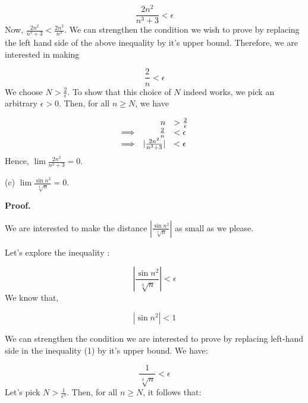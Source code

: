 \documentclass[10pt]{article}
\begin{document}
\begin{equation*}
\frac{2n^{2}}{n^{3} +3} < \epsilon 
\end{equation*}
Now, $\displaystyle \frac{2n^{2}}{n^{3} +3} < \frac{2n^{2}}{n^{3}}$. We can strengthen the condition we wish to prove by replacing the left hand side of the above inequality by it's upper bound. Therefore, we are interested in making


\begin{equation*}
\frac{2}{n} < \epsilon 
\end{equation*}
We choose $\displaystyle N >\frac{2}{\epsilon }$. To show that this choice of $\displaystyle N$ indeed works, we pick an arbitrary $\displaystyle \epsilon  >0$. Then, for all $\displaystyle n\geq N$, we have 


\begin{equation*}
\begin{array}{ c r l }
 & n &  >\frac{2}{\epsilon }\\
\Longrightarrow  & \frac{2}{n} & < \epsilon \\
\Longrightarrow  & |\frac{2n^{2}}{n^{3} +3} | & < \epsilon 
\end{array}
\end{equation*}
Hence, $\displaystyle \lim \frac{2n^{2}}{n^{3} +3} =0$.



(c) $\displaystyle \lim \frac{\sin n^{2}}{\sqrt[3] n} =0$.



\textbf{Proof.}



We are interested to make the distance $\displaystyle |\frac{\sin n^{2}}{\sqrt[3] n} |$ as small as we please.



Let's explore the inequality :


\begin{equation}
|\frac{\sin n^{2}}{\sqrt[3] n} |< \epsilon 
\end{equation}
We know that,


\begin{equation*}
|\sin n^{2} |< 1
\end{equation*}


We can strengthen the condition we are interested to prove by replacing left-hand side in the inequality (1) by it's upper bound. We have:


\begin{equation*}
\frac{1}{\sqrt[3] n} < \epsilon 
\end{equation*}
Let's pick $\displaystyle N >\frac{1}{\epsilon ^{3}}$. Then, for all $\displaystyle n\geq N$, it follows that:
\end{document}
